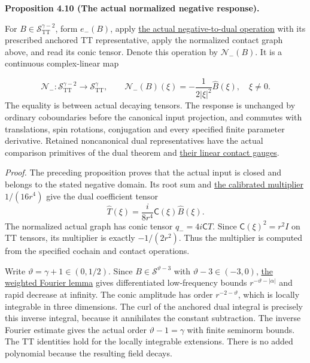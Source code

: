 \documentclass[
  english,
  11pt,
  reqno]{amsart}
\makeatletter
\newcommand{\pandocstatementheading}[1]{%
  \par\addpenalty{\@beginparpenalty}%
  \addvspace{.5\baselineskip plus .2\baselineskip minus .2\baselineskip}%
  {\normalfont\bfseries #1\par}%
  \nobreak\@afterindenttrue\@afterheading
}
\makeatother
\begin{document}
\pandocstatementheading{\leavevmode{}\label{prop:online-normalized-negative-half-newton}Proposition 4.10 (The actual normalized negative response).}

For \(B\in\mathscr S^{\gamma-2}_{\mathrm{TT}}\), form \(e_-(B)\), apply
\hyperref[thm:online-actual-weighted-negative-dual]{the actual
negative-to-dual operation} with its prescribed anchored TT
representative, apply the normalized contact graph above, and read its
conic tensor. Denote this operation by \(\mathcal N_-(B)\). It is a
continuous complex-linear map

\label{eq:online-normalized-negative-half-newton} \[
\mathcal N_-:\mathscr S^{\gamma-2}_{\mathrm{TT}}
\longrightarrow\mathscr S^\gamma_{\mathrm{TT}},
\qquad
\widehat{\mathcal N_-(B)}(\xi)
=-\frac1{2|\xi|^2}\widehat B(\xi),\quad \xi\ne0.
\] The equality is between actual decaying tensors. The response is
unchanged by ordinary coboundaries before the canonical input
projection, and commutes with translations, spin rotations, conjugation
and every specified finite parameter derivative. Retained noncanonical
dual representatives have the actual comparison primitives of the dual
theorem and
\hyperref[prop:online-dual-primitive-linear-contact-gauge]{their linear
contact gauges}.

\emph{Proof.} The preceding proposition proves that the actual input is
closed and belongs to the stated negative domain. Its root sum and
\hyperref[eq:online-negative-dual-calibrated-multiplier]{the calibrated
multiplier} \(1/(16r^4)\) give the dual coefficient tensor \[
\widehat T(\xi)=\frac{i}{8r^4}\mathsf C(\xi)\widehat B(\xi).
\] The normalized actual graph has conic tensor \(q_-=4i\mathsf CT\).
Since \(\mathsf C(\xi)^2=r^2I\) on TT tensors, its multiplier is exactly
\(-1/(2r^2)\). Thus the multiplier is computed from the specified
cochain and contact operations.

Write \(\vartheta=\gamma+1\in(0,1/2)\). Since
\(B\in\mathscr S^{\vartheta-3}\) with \(\vartheta-3\in(-3,0)\),
\hyperref[lem:online-decay-fourier-isomorphism]{the weighted Fourier
lemma} gives differentiated low-frequency bounds
\(r^{-\vartheta-|\alpha|}\) and rapid decrease at infinity. The conic
amplitude has order \(r^{-2-\vartheta}\), which is locally integrable in
three dimensions. The curl of the anchored dual integral is precisely
this inverse integral, because it annihilates the constant subtraction.
The inverse Fourier estimate gives the actual order
\(\vartheta-1=\gamma\) with finite seminorm bounds. The TT identities
hold for the locally integrable extensions. There is no added polynomial
because the resulting field decays.
\end{document}
